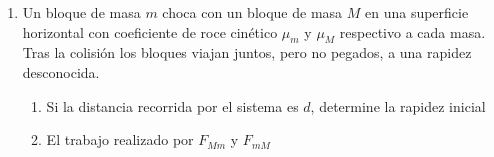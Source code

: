\documentclass[letterpaper,11pt]{article}
\begin{document}
\begin{enumerate}
\item Un bloque de masa $m$ choca con un bloque de masa $M$ en una superficie horizontal con coeficiente de roce cinético $\mu_m$ y $\mu_M$ respectivo a cada masa. Tras la colisión los bloques viajan juntos, pero no pegados, a una rapidez desconocida.
\begin{enumerate}
    \item Si la distancia recorrida por el sistema es $d$, determine la rapidez inicial
    \item El trabajo realizado por $F_{Mm}$ y $F_{mM}$
\end{enumerate}

%   

\end{enumerate}
\end{document}
